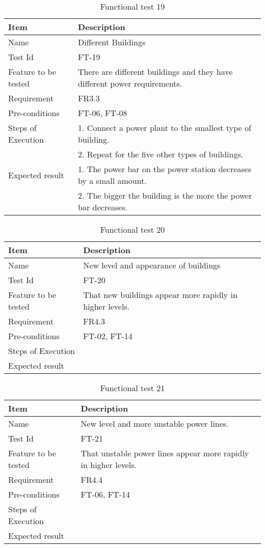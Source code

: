 \begin{table}[H]
\centering
	\begin{tabular}{ l | p{8cm} }
		\hline
		{\bf Item} & {\bf Description} \\ \hline
		Name & Different Buildings \\ 
		Test Id & FT-19 \\ 
		Feature to be tested & There are different buildings and they have different power requirements. \\ 
		Requirement & FR3.3 \\ 
		Pre-conditions & FT-06, FT-08 \\ 
		Steps of Execution & 1. Connect a power plant to the smallest type of building. \\
		& 2. Repeat for the five other types of buildings. \\
		Expected result & 1. The power bar on the power station decreases by a small amount. \\
		& 2. The bigger the building is the more the power bar decreases. \\
	\end{tabular}
	\caption{Functional test 19}
\end{table}

\begin{table}[H]
\centering
	\begin{tabular}{ l | p{8cm} }
		\hline
		{\bf Item} & {\bf Description} \\ \hline
		Name & New level and appearance of buildings \\ 
		Test Id & FT-20 \\ 
		Feature to be tested & That new buildings appear more rapidly in higher levels. \\ 
		Requirement & FR4.3 \\ 
		Pre-conditions & FT-02, FT-14\\ 
		Steps of Execution &  \\ 
		Expected result & \\ 
	\end{tabular}
	\caption{Functional test 20}
\end{table}

\begin{table}[H]
\centering
	\begin{tabular}{ l | p{8cm} }
		\hline
		{\bf Item} & {\bf Description} \\ \hline
		Name & New level and more unstable power lines. \\ 
		Test Id & FT-21 \\ 
		Feature to be tested & That unstable power lines appear more rapidly in higher levels. \\ 
		Requirement & FR4.4 \\ 
		Pre-conditions & FT-06, FT-14\\ 
		Steps of Execution &  \\ 
		Expected result & \\ 
	\end{tabular}
	\caption{Functional test 21}
\end{table}

